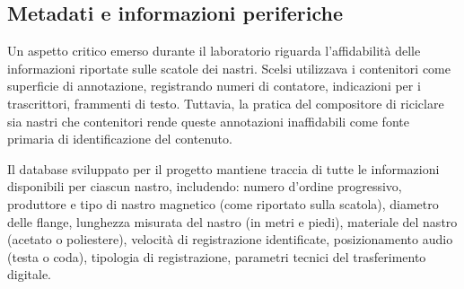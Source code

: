 \subsection{Metadati e informazioni periferiche}
Un aspetto critico emerso durante il laboratorio riguarda l'affidabilità delle informazioni riportate sulle scatole dei nastri. Scelsi utilizzava i contenitori come superficie di annotazione, registrando numeri di contatore, indicazioni per i trascrittori, frammenti di testo. Tuttavia, la pratica del compositore di riciclare sia nastri che contenitori rende queste annotazioni inaffidabili come fonte primaria di identificazione del contenuto.

Il database sviluppato per il progetto mantiene traccia di tutte le informazioni disponibili per ciascun nastro, includendo: numero d'ordine progressivo, produttore e tipo di nastro magnetico (come riportato sulla scatola), diametro delle flange, lunghezza misurata del nastro (in metri e piedi), materiale del nastro (acetato o poliestere), velocità di registrazione identificate, posizionamento audio (testa o coda), tipologia di registrazione, parametri tecnici del trasferimento digitale.

